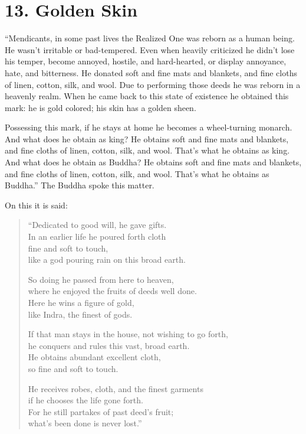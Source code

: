 \documentclass[12pt,openany]{book}%
\begin{document}
\section*{13. Golden Skin }

“Mendicants, in some past lives the Realized One was reborn as a human being. He wasn’t irritable or bad-tempered. Even when heavily criticized he didn’t lose his temper, become annoyed, hostile, and hard-hearted, or display annoyance, hate, and bitterness. He donated soft and fine mats and blankets, and fine cloths of linen, cotton, silk, and wool. Due to performing those deeds he was reborn in a heavenly realm. When he came back to this state of existence he obtained this mark: he is gold colored; his skin has a golden sheen. 

Possessing this mark, if he stays at home he becomes a wheel-turning monarch. And what does he obtain as king? He obtains soft and fine mats and blankets, and fine cloths of linen, cotton, silk, and wool. That’s what he obtains as king. And what does he obtain as Buddha? He obtains soft and fine mats and blankets, and fine cloths of linen, cotton, silk, and wool. That’s what he obtains as Buddha.” The Buddha spoke this matter. 

On this it is said: 

\begin{verse}%
“Dedicated to good will, he gave gifts. \\
In an earlier life he poured forth cloth \\
fine and soft to touch, \\
like a god pouring rain on this broad earth. 

So doing he passed from here to heaven, \\
where he enjoyed the fruits of deeds well done. \\
Here he wins a figure of gold, \\
like Indra, the finest of gods. 

If that man stays in the house, not wishing to go forth, \\
he conquers and rules this vast, broad earth. \\
He obtains abundant excellent cloth, \\
so fine and soft to touch. 

He receives robes, cloth, and the finest garments \\
if he chooses the life gone forth. \\
For he still partakes of past deed’s fruit; \\
what’s been done is never lost.” 

%
\end{verse}
\end{document}

